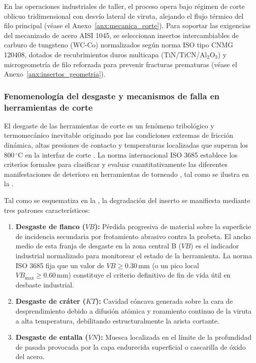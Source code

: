 En las operaciones industriales de taller, el proceso opera bajo régimen de corte oblicuo tridimensional con desvío lateral de viruta, alejando el flujo térmico del filo principal (véase el Anexo~\ref{anx:mecanica_corte}). Para soportar las exigencias del mecanizado de acero AISI 1045, se seleccionan insertos intercambiables de carburo de tungsteno (WC-Co) normalizados según norma ISO tipo CNMG 120408, dotados de recubrimientos duros multicapa (TiN/TiCN/Al$_2$O$_3$) y microgeometría de filo reforzada para prevenir fracturas prematuras (véase el Anexo~\ref{anx:insertos_geometria}).

\subsubsection{Fenomenología del desgaste y mecanismos de falla en herramientas de corte}

El desgaste de las herramientas de corte es un fenómeno tribológico y termomecánico inevitable originado por las condiciones extremas de fricción dinámica, altas presiones de contacto y temperaturas localizadas que superan los 800\,$^\circ\text{C}$ en la interfaz de corte \citep{trent2000, ramirez2018}. La norma internacional ISO 3685 establece los criterios formales para clasificar y evaluar cuantitativamente las diferentes manifestaciones de deterioro en herramientas de torneado \citep{iso3685}, tal como se ilustra en la .


Tal como se esquematiza en la , la degradación del inserto se manifiesta mediante tres patrones característicos:
\begin{enumerate}
    \item \textbf{Desgaste de flanco ($VB$):} Pérdida progresiva de material sobre la superficie de incidencia secundaria por frotamiento abrasivo contra la probeta. El ancho medio de esta franja de desgaste en la zona central B ($VB$) es el indicador industrial normalizado para monitorear el estado de la herramienta. La norma ISO 3685 fija que un valor de $VB \ge 0.30\,\text{mm}$ (o un pico local $VB_{\max} \ge 0.60\,\text{mm}$) constituye el criterio definitivo de fin de vida útil en desbaste industrial.
    \item \textbf{Desgaste de cráter ($KT$):} Cavidad cóncava generada sobre la cara de desprendimiento debido a difusión atómica y rozamiento continuo de la viruta a alta temperatura, debilitando estructuralmente la arista cortante.
    \item \textbf{Desgaste de entalla ($VN$):} Muesca localizada en el límite de la profundidad de pasada provocada por la capa endurecida superficial o cascarilla de óxido del acero.
\end{enumerate}

